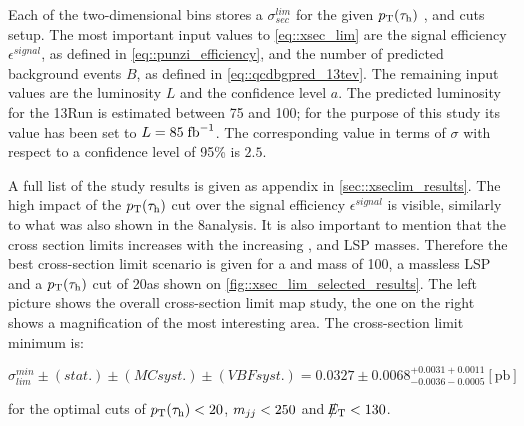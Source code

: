 Each of the two-dimensional bins stores a $\sigma^{lim}_{sec}$ for the given $p_{\text{T}}(\tau_{\text{h}})$ , \mjj and \met cuts setup. The most important input values to \autoref{eq::xsec_lim} are the signal efficiency $\epsilon^{signal}$, as defined in \autoref{eq::punzi_efficiency},  and the number of predicted background events $B$, as defined in \autoref{eq::qcdbgpred_13tev}. The remaining input values are the luminosity $L$ and the confidence level $a$. The predicted luminosity for the 13\tev Run \cite{Bruning:2002yh} is estimated between 75 and 100\invfb; for the purpose of this study its value has been set to $L = 85\;\text{fb}^{-1}$. The corresponding value in terms of $\sigma$ with respect to a confidence level of 95\%  is $2.5$.

A full list of the study results is given as appendix in \autoref{sec::xseclim_results}. The high impact of the $p_{\text{T}}(\tau_{\text{h}})$ cut over the signal efficiency $\epsilon^{signal}$ is visible, similarly to what was also shown in the 8\tev analysis. It is also important to mention that the cross section limits increases with the increasing \charginopm, \neutralinotwo and LSP masses. Therefore the best cross-section limit scenario is given for a \charginopm and \neutralinotwo mass of 100\gev, a massless LSP and a $p_{\text{T}}(\tau_{\text{h}})$ cut of 20\gev as shown on \autoref{fig::xsec_lim_selected_results}. The left picture shows the overall cross-section limit map study, the one on the right shows a magnification of the most interesting area. The cross-section limit minimum is:

\begin{equation}
\sigma_{lim}^{min}\pm(stat.)\pm(MC syst.)\pm(VBF syst.) = 0.0327\pm0.0068^{+0.0031+ 0.0011}_{-0.0036-0.0005} [\text{pb}]
\label{eq::xsec_lim_best_result}
\end{equation}

for the optimal cuts of  $p_{\text{T}}(\tau_{\text{h}}) <  20$,  $ m_{jj}< 250 $ and $\slash\mkern-12mu{E}_{\text{T}} < 130$.


